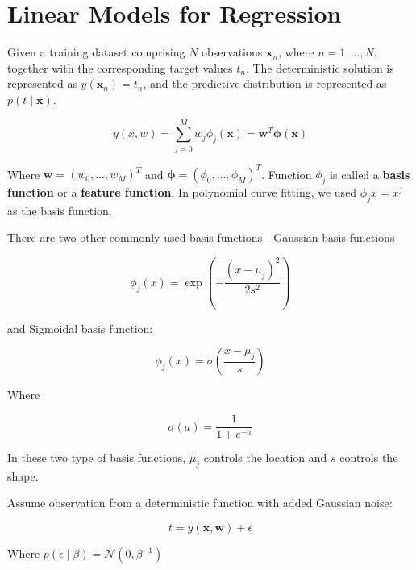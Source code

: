 \section{Linear Models for Regression}\label{sec:linear_models_for_regression}

Given a training dataset comprising $N$ observations ${\mathbf{x}_n}$, where $n = 1, \dots, N$, together with the corresponding target values ${t_n}$.
The deterministic solution is represented as $y(\mathbf{x}_n) = t_n$, and the predictive distribution is represented as $p(t \mid \mathbf{x})$.

\[
    y(x, w) = \sum_{j = 0}^{M}{w_j\phi_j(\mathbf{x})} = \mathbf{w}^T\bm{\phi}(\mathbf{x})
\]

Where $\mathbf{w} = (w_0, \dots, w_{M})^T$ and $\bm{\phi} = (\phi_0, \dots, \phi_{M})^T$.
Function $\phi_j$ is called a \textbf{basis function} or a \textbf{feature function}.
In polynomial curve fitting, we used $\phi_j{x}=x^j$ as the basis function.

There are two other commonly used basis functions—Gaussian basis functions

\[
    \phi_j(x) = \exp{\left(-\frac{(x - \mu_j)^2}{2s^2}\right)}
\]

and Sigmoidal basis function:

\[
    \phi_j(x) = \sigma\left(\frac{x - \mu_j}{s}\right)
\]

Where

\[
    \sigma(a) = \frac{1}{1 + e^{-a}}
\]

In these two type of basis functions, $\mu_j$ controls the location and $s$ controls the shape.

Assume observation from a deterministic function with added Gaussian noise:

\[
    t = y(\bm{x}, \bm{w}) + \epsilon
\]

Where $p(\epsilon \mid \beta) = \mathcal{N}(0, \beta^{-1})$